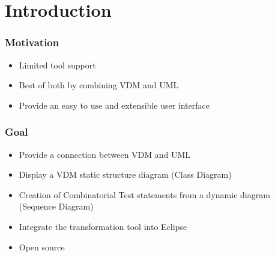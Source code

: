 %
%
\section{Introduction}
%
%
\frame
{
  \frametitle{Motivation}

\begin{center}
  \begin{itemize}
  		\item Limited tool support
  		\item Best of both by combining VDM and UML
  		\item Provide an easy to use and extensible user interface
  \end{itemize}
\end{center}
}



%
%
\frame
{
  \frametitle{Goal}

\begin{center}
  \begin{itemize}
  		\item Provide a connection between VDM and UML
  		\item Display a VDM static structure diagram (Class Diagram)
  		\item Creation of Combinatorial Test statements from a dynamic diagram (Sequence Diagram)
  		\item Integrate the transformation tool into Eclipse
  		\item Open source
	  	
  \end{itemize}
\end{center}
}

